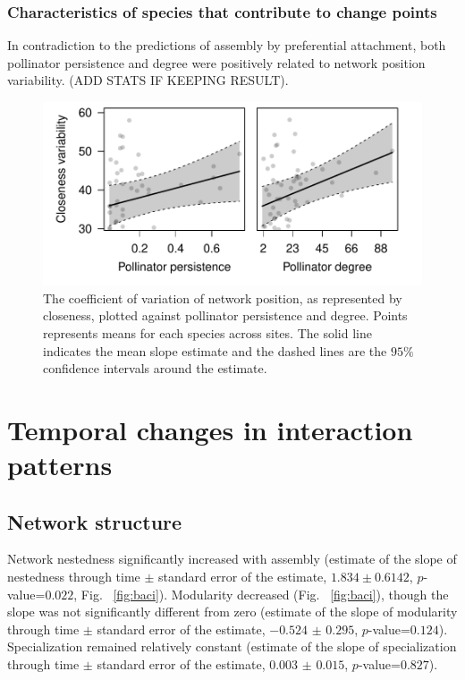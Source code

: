\documentclass[12pt]{article}
\begin{document}
\subsubsection*{Characteristics of species that contribute to change
  points}

In contradiction to the predictions of assembly by preferential
attachment, both pollinator persistence and degree were positively
related to network position variability. (ADD STATS IF KEEPING
RESULT).

\begin{figure}
  \centering
  \includegraphics[width=.8\textwidth]{../analysis/variability/figures/cv/occ_degree.pdf}
  \caption{The coefficient of variation of network position, as
    represented by closeness, plotted against pollinator persistence
    and degree. Points represents means for each species across sites.
    The solid line indicates the mean slope estimate and the dashed
    lines are the $95\%$ confidence intervals around the estimate. }
  \label{fig:cv}
\end{figure}
\clearpage

\section*{Temporal changes in interaction patterns}
\subsection*{Network structure}
Network nestedness significantly increased with assembly (estimate of
the slope of nestedness through time $\pm$ standard error of the
estimate, $1.834 \pm 0.6142$, $p$-value=$0.022$, Fig.~
\ref{fig:baci}).  Modularity decreased (Fig.~ \ref{fig:baci}), though
the slope was not significantly different from zero (estimate of the
slope of modularity through time $\pm$ standard error of the estimate,
$-0.524$ $\pm$ $0.295$, $p$-value=$0.124$). Specialization remained
relatively constant (estimate of the slope of specialization through time
$\pm$ standard error of the estimate, $0.003$ $\pm$ $0.015$,
$p$-value=$0.827$).
\end{document}
